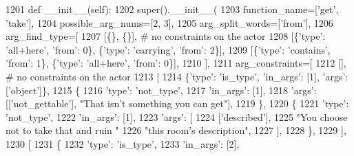 \begin{DoxyCode}
1201     \textcolor{keyword}{def }\_\_init\_\_(self):
1202         super().\_\_init\_\_(
1203             function\_name=[\textcolor{stringliteral}{'get'}, \textcolor{stringliteral}{'take'}],
1204             possible\_arg\_nums=[2, 3],
1205             arg\_split\_words=[\textcolor{stringliteral}{'from'}],
1206             arg\_find\_type=[
1207                 [\{\}, \{\}],  \textcolor{comment}{# no constraints on the actor}
1208                 [\{\textcolor{stringliteral}{'type'}: \textcolor{stringliteral}{'all+here'}, \textcolor{stringliteral}{'from'}: 0\}, \{\textcolor{stringliteral}{'type'}: \textcolor{stringliteral}{'carrying'}, \textcolor{stringliteral}{'from'}: 2\}],
1209                 [\{\textcolor{stringliteral}{'type'}: \textcolor{stringliteral}{'contains'}, \textcolor{stringliteral}{'from'}: 1\}, \{\textcolor{stringliteral}{'type'}: \textcolor{stringliteral}{'all+here'}, \textcolor{stringliteral}{'from'}: 0\}],
1210             ],
1211             arg\_constraints=[
1212                 [],  \textcolor{comment}{# no constraints on the actor}
1213                 [
1214                     \{\textcolor{stringliteral}{'type'}: \textcolor{stringliteral}{'is\_type'}, \textcolor{stringliteral}{'in\_args'}: [1], \textcolor{stringliteral}{'args'}: [\textcolor{stringliteral}{'object'}]\},
1215                     \{
1216                         \textcolor{stringliteral}{'type'}: \textcolor{stringliteral}{'not\_type'},
1217                         \textcolor{stringliteral}{'in\_args'}: [1],
1218                         \textcolor{stringliteral}{'args'}: [[\textcolor{stringliteral}{'not\_gettable'}], \textcolor{stringliteral}{"That isn't something you can get"}],
1219                     \},
1220                     \{
1221                         \textcolor{stringliteral}{'type'}: \textcolor{stringliteral}{'not\_type'},
1222                         \textcolor{stringliteral}{'in\_args'}: [1],
1223                         \textcolor{stringliteral}{'args'}: [
1224                             [\textcolor{stringliteral}{'described'}],
1225                             \textcolor{stringliteral}{"You choose not to take that and ruin "}
1226                             \textcolor{stringliteral}{"this room's description"},
1227                         ],
1228                     \},
1229                 ],
1230                 [
1231                     \{
1232                         \textcolor{stringliteral}{'type'}: \textcolor{stringliteral}{'is\_type'},
1233                         \textcolor{stringliteral}{'in\_args'}: [2],

\end{DoxyCode}
